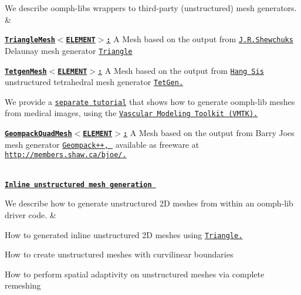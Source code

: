 \begin{longtabu}
We describe {\ttfamily oomph-\/lib\textquotesingle{}s} wrappers to third-\/party (unstructured) mesh generators.  &
\begin{DoxyItemize}
\item \href{../../meshes/mesh_from_triangle/html/index.html}{\tt {\bfseries  Triangle\+Mesh$<$\+E\+L\+E\+M\+E\+N\+T$>$\+:}} A Mesh based on the output from \href{http://www.cs.cmu.edu/~jrs}{\tt J.\+R.\+Shewchuk\textquotesingle{}s} Delaunay mesh generator \href{http://www.cs.cmu.edu/~quake/triangle.html}{\tt {\ttfamily Triangle}}
\item \href{../../meshes/mesh_from_tetgen/html/index.html}{\tt {\bfseries  Tetgen\+Mesh$<$\+E\+L\+E\+M\+E\+N\+T$>$\+:}} A Mesh based on the output from \href{http://www.wias-berlin.de/~si}{\tt Hang Si\textquotesingle{}s} unstructured tetrahedral mesh generator \href{http://wias-berlin.de/software/tetgen//index.html}{\tt {\ttfamily Tet\+Gen.}}
\item We provide a \href{../../meshes/mesh_from_vmtk/html/index.html}{\tt separate tutorial} that shows how to generate {\ttfamily oomph-\/lib} meshes from medical images, using the \href{http://www.vmtk.org}{\tt Vascular Modeling Toolkit (V\+M\+TK).}
\item \href{../../meshes/mesh_from_geompack/html/index.html}{\tt {\bfseries  Geompack\+Quad\+Mesh$<$\+E\+L\+E\+M\+E\+N\+T$>$\+:}} A Mesh based on the output from Barry Joe\textquotesingle{}s mesh generator \href{http://members.shaw.ca/bjoe/}{\tt {\ttfamily Geompack++}, } available as freeware at \href{http://members.shaw.ca/bjoe/}{\tt http\+://members.\+shaw.\+ca/bjoe/.} 
\end{DoxyItemize}

\\
{\bfseries  \href{../../meshes/mesh_from_inline_triangle/html/index.html}{\tt Inline unstructured mesh generation } }

We describe how to generate unstructured 2D meshes from within an {\ttfamily oomph-\/lib} driver code.  &
\begin{DoxyItemize}
\item How to generated inline unstructured 2D meshes using \href{http://www.cs.cmu.edu/~quake/triangle.html}{\tt Triangle.}
\item How to create unstructured meshes with curvilinear boundaries
\item How to perform spatial adaptivity on unstructured meshes via complete remeshing 
\end{DoxyItemize}




\end{longtabu}
